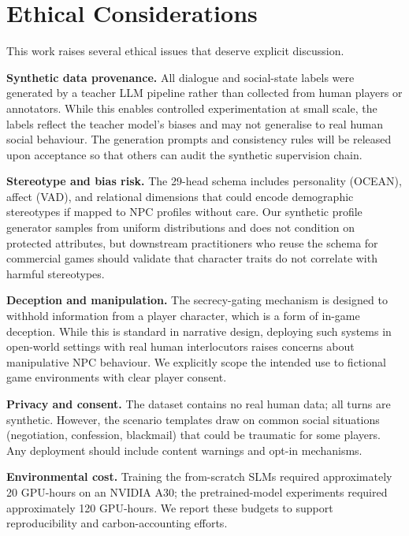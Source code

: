 \documentclass[11pt]{article}
\begin{document}
\section*{Ethical Considerations}

This work raises several ethical issues that deserve explicit discussion.

\textbf{Synthetic data provenance.} All dialogue and social-state labels were generated by a teacher LLM pipeline rather than collected from human players or annotators.
While this enables controlled experimentation at small scale, the labels reflect the teacher model's biases and may not generalise to real human social behaviour.
The generation prompts and consistency rules will be released upon acceptance so that others can audit the synthetic supervision chain.

\textbf{Stereotype and bias risk.} The 29-head schema includes personality (OCEAN), affect (VAD), and relational dimensions that could encode demographic stereotypes if mapped to NPC profiles without care.
Our synthetic profile generator samples from uniform distributions and does not condition on protected attributes, but downstream practitioners who reuse the schema for commercial games should validate that character traits do not correlate with harmful stereotypes.

\textbf{Deception and manipulation.} The secrecy-gating mechanism is designed to withhold information from a player character, which is a form of in-game deception.
While this is standard in narrative design, deploying such systems in open-world settings with real human interlocutors raises concerns about manipulative NPC behaviour.
We explicitly scope the intended use to fictional game environments with clear player consent.

\textbf{Privacy and consent.} The dataset contains no real human data; all turns are synthetic.
However, the scenario templates draw on common social situations (negotiation, confession, blackmail) that could be traumatic for some players.
Any deployment should include content warnings and opt-in mechanisms.

\textbf{Environmental cost.} Training the from-scratch SLMs required approximately 20 GPU-hours on an NVIDIA A30; the pretrained-model experiments required approximately 120 GPU-hours.
We report these budgets to support reproducibility and carbon-accounting efforts.



\appendix
\end{document}
